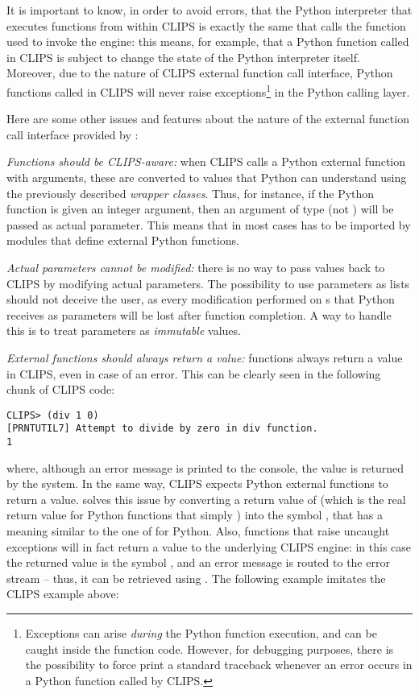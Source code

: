 It is important to know, in order to avoid errors, that the Python
interpreter that executes functions from within CLIPS is exactly the
same that calls the \pyclips{} function used to invoke the engine: this
means, for example, that a Python function called in CLIPS is subject
to change the state of the Python interpreter itself. Moreover, due
to the nature of CLIPS external function call interface, Python functions
called in CLIPS will never raise exceptions\footnote{Exceptions can
arise \emph{during} the Python function execution, and can be caught
inside the function code. However, for debugging purposes, there is the
possibility to force \pyclips{} print a standard traceback whenever an
error occurs in a Python function called by CLIPS.} in the Python calling
layer.

Here are some other issues and features about the nature of the external
function call interface provided by \pyclips{}:

\emph{Functions should be CLIPS-aware:} when CLIPS calls a Python external
function with arguments, these are converted to values that Python can
understand using the previously described \emph{wrapper classes}. Thus,
for instance, if the Python function is given an integer argument, then
an argument of type  (not ) will be passed as
actual parameter. This means that in most cases \pyclips{} has to be
imported by modules that define external Python functions.

\emph{Actual parameters cannot be modified:} there is no way to pass values
back to CLIPS by modifying actual parameters. The possibility to use
 parameters as lists should not deceive the user, as
every modification performed on s that Python receives
as parameters will be lost after function completion. A way to handle this
is to treat parameters as \emph{immutable} values.

\emph{External functions should always return a value:} functions always
return a value in CLIPS, even in case of an error. This can be clearly
seen in the following chunk of CLIPS code:

\begin{verbatim}
CLIPS> (div 1 0)
[PRNTUTIL7] Attempt to divide by zero in div function.
1
\end{verbatim}

where, although an error message is printed to the console, the value
 is returned by the system. In the same way, CLIPS expects
Python external functions to return a value. \pyclips{} solves this issue
by converting a return value of  (which is the real return
value for Python functions that simply ) into the symbol
, that has a meaning similar to the one of  for
Python. Also, functions that raise uncaught exceptions will in fact return
a value to the underlying CLIPS engine: in this case the returned value
is the symbol , and an error message is routed to the error
stream -- thus, it can be retrieved using .
The following example imitates the  CLIPS example above:

